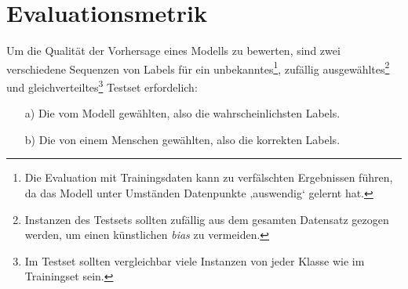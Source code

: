 \section{Evaluationsmetrik}
\label{evaluation}

Um die Qualität der Vorhersage eines Modells zu bewerten, sind zwei verschiedene Sequenzen von Labels für ein unbekanntes\footnote{Die Evaluation mit Trainingsdaten kann zu verfälschten Ergebnissen führen, da das Modell unter Umständen Datenpunkte ‚auswendig‘ gelernt hat.}, zufällig ausgewähltes\footnote{Instanzen des Testsets sollten zufällig aus dem gesamten Datensatz gezogen werden, um einen künstlichen \textit{bias} zu vermeiden.} und gleichverteiltes\footnote{Im Testset sollten vergleichbar viele Instanzen von jeder Klasse wie im Trainingset sein.} Testset erfordelich:

\begin{itemize}
\item[a)] Die vom Modell gewählten, also die \hspace{0.3mm}w\hspace{0.3mm}a\hspace{0.3mm}h\hspace{0.3mm}r\hspace{0.3mm}s\hspace{0.3mm}c\hspace{0.3mm}h\hspace{0.3mm}e\hspace{0.3mm}i\hspace{0.3mm}n\hspace{0.3mm}l\hspace{0.3mm}i\hspace{0.3mm}c\hspace{0.3mm}h\hspace{0.3mm}s\hspace{0.3mm}t\hspace{0.3mm}e\hspace{0.3mm}n\hspace{0.3mm} Labels.
\item[b)] Die von einem Menschen gewählten, also die \hspace{0.3mm}k\hspace{0.3mm}o\hspace{0.3mm}r\hspace{0.3mm}r\hspace{0.3mm}e\hspace{0.3mm}k\hspace{0.3mm}t\hspace{0.3mm}e\hspace{0.3mm}n\hspace{0.3mm} Labels.
\end{itemize}

